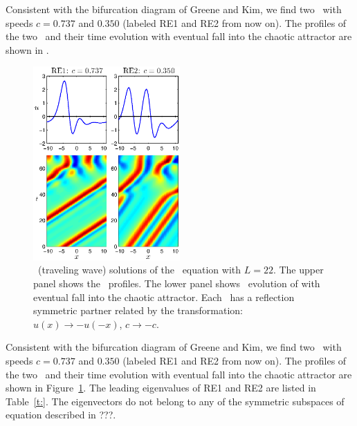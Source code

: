 Consistent with the bifurcation diagram of Greene and Kim,
we find two \reqva\ with speeds $c = 0.737$ and $0.350$
(labeled RE1 and RE2 from now on).
The profiles of the two \reqva\ and their time evolution
with eventual fall into the chaotic attractor are
shown in .


\begin{figure}[h]\vspace*{-5pt} \centering
\includegraphics[width=0.5\textwidth]{figs/ks22_RE1-2.eps}
\vspace*{-5pt}\caption{ {\small \Reqv\ (traveling wave)
solutions of the \KS\ equation with $L = 22.$ The upper panel shows
the \Reqva\ profiles. The lower panel shows \Reqva\ evolution
of \reqva with eventual fall into the chaotic attractor.
Each \reqv\ has a reflection symmetric partner related by the
transformation: $u(x) \to -u(-x)$, $c \to -c$.}}
\label{f:ks22RE}\vspace*{-5pt}
\end{figure}

Consistent with the bifurcation diagram of Greene and Kim,
we find two \reqva\ with speeds $c = 0.737$ and $0.350$
(labeled RE1 and RE2 from now on).
The profiles of the two \reqva\ and their time evolution
with eventual fall into the chaotic attractor are
shown in Figure~\ref{f:ks22RE}.  The leading eigenvalues of
RE1 and RE2 are listed in Table~\ref{t:}.  The eigenvectors
do not belong to any of the symmetric subspaces of \KS equation
described in ???.

